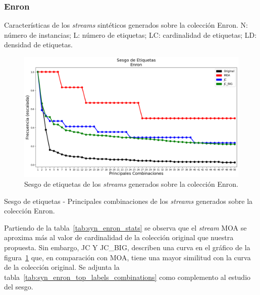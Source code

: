 \subsubsection{Enron}

\begin{table}[htbp]
	\centering
	\begin{adjustbox}{max width=\textwidth}
		
	\end{adjustbox}
	\caption[Características de los \textit{streams} sintéticos generados sobre
		la colección Enron.]{Características de los \textit{streams} sintéticos generados sobre
		la colección Enron.  N: número de instancias; L: número de etiquetas; LC:
		cardinalidad de etiquetas; LD: densidad de etiquetas.}
	\label{tab:syn_enron_stats}
\end{table}

\begin{figure}[htbp]
	\includegraphics[width=\linewidth]{figures/experiments/syn/enron/label_skew.png}
	\caption{Sesgo de etiquetas de los \textit{streams} generados sobre la colección
		Enron.}
	\label{fig:syn_enron_label_skew}
\end{figure}

\begin{table}[htbp]
	\centering
	\begin{adjustbox}{max width=\textwidth}
		
	\end{adjustbox}
	\caption{Sesgo de etiquetas - Principales combinaciones de los
		\textit{streams} generados sobre la colección Enron.}
	\label{tab:syn_enron_top_labels_combinations}
\end{table}

Partiendo de la tabla~\ref{tab:syn_enron_stats} se observa que el
\textit{stream} MOA se aproxima más al valor de cardinalidad de la colección
original que nuestra propuesta. Sin embargo, JC Y JC\_BIG, describen una curva
en el gráfico de la figura~\ref{fig:syn_enron_label_skew} que, en comparación
con MOA, tiene una mayor similitud con la curva de la colección original.  Se
adjunta la tabla~\ref{tab:syn_enron_top_labels_combinations} como complemento al
estudio del sesgo.

